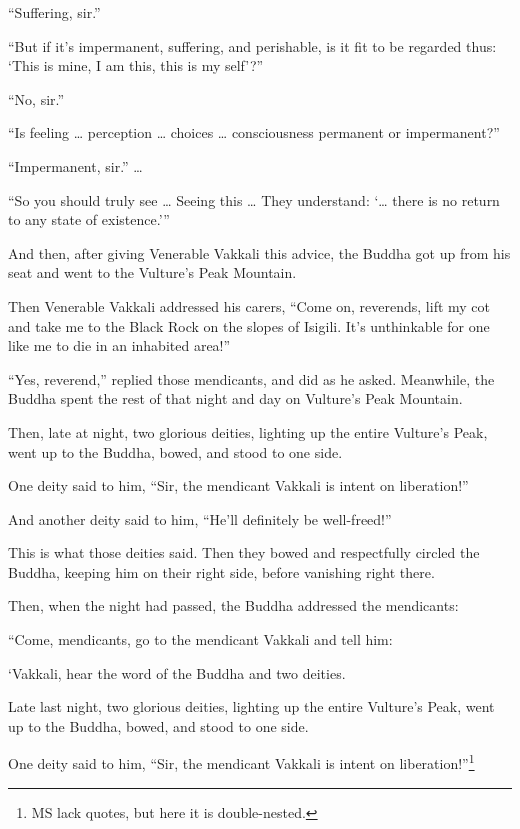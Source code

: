 \documentclass[12pt,openany]{book}%
\begin{document}
“Suffering, sir.” 

“But if it’s impermanent, suffering, and perishable, is it fit to be regarded thus: ‘This is mine, I am this, this is my self’?” 

“No, sir.” 

“Is feeling … perception … choices … consciousness permanent or impermanent?” 

“Impermanent, sir.” … 

“So you should truly see … Seeing this … They understand: ‘… there is no return to any state of existence.’” 

And then, after giving Venerable Vakkali this advice, the Buddha got up from his seat and went to the Vulture’s Peak Mountain. 

Then Venerable Vakkali addressed his carers, “Come on, reverends, lift my cot and take me to the Black Rock on the slopes of Isigili. It’s unthinkable for one like me to die in an inhabited area!” 

“Yes, reverend,” replied those mendicants, and did as he asked. Meanwhile, the Buddha spent the rest of that night and day on Vulture’s Peak Mountain. 

Then, late at night, two glorious deities, lighting up the entire Vulture’s Peak, went up to the Buddha, bowed, and stood to one side. 

One deity said to him, “Sir, the mendicant Vakkali is intent on liberation!” 

And another deity said to him, “He’ll definitely be well-freed!” 

This is what those deities said. Then they bowed and respectfully circled the Buddha, keeping him on their right side, before vanishing right there. 

Then, when the night had passed, the Buddha addressed the mendicants: 

“Come, mendicants, go to the mendicant Vakkali and tell him: 

‘Vakkali, hear the word of the Buddha and two deities. 

Late last night, two glorious deities, lighting up the entire Vulture’s Peak, went up to the Buddha, bowed, and stood to one side. 

One deity said to him, “Sir, the mendicant Vakkali is intent on liberation!”\footnote{MS lack quotes, but here it is double-nested. } 
\end{document}
